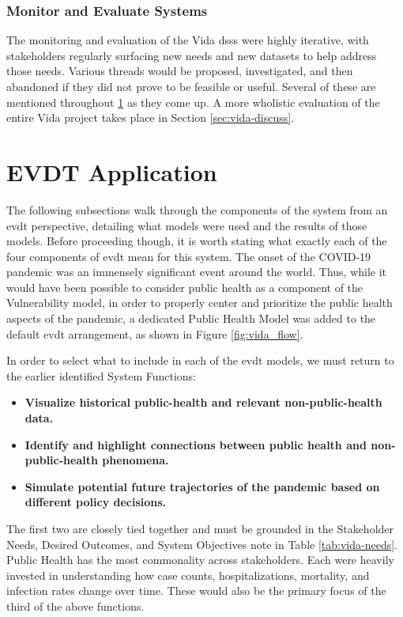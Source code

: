 \subsubsection{Monitor and Evaluate Systems}

The monitoring and evaluation of the Vida \acp{dss} were highly iterative, with stakeholders regularly surfacing new needs and new datasets to help address those needs. Various threads would be proposed, investigated, and then abandoned if they did not prove to be feasible or useful. Several of these are mentioned throughout \ref{sec:vida-evdt} as they come up. A more wholistic evaluation of the entire Vida project takes place in Section \ref{sec:vida-discuss}.

\section{EVDT Application} \label{sec:vida-evdt}

The following subsections walk through the components of the system from an \acf{evdt} perspective, detailing what models were used and the results of those models. Before proceeding though, it is worth stating what exactly each of the four components of \ac{evdt} mean for this system. The onset of the COVID-19 pandemic was an immensely significant event around the world. Thus, while it would have been possible to consider public health as a component of the Vulnerability model, in order to properly center and prioritize the public health aspects of the pandemic, a dedicated Public Health Model was added to the default \ac{evdt} arrangement, as shown in Figure \ref{fig:vida_flow}. 

In order to select what to include in each of the \ac{evdt} models, we must return to the earlier identified System Functions:

\begin{itemize}[itemsep=0pt,parsep=0pt]
	\item{\textbf{Visualize historical public-health and relevant non-public-health data.}}
	\item{\textbf{Identify and highlight connections between public health and non-public-health phenomena.}}
	\item{\textbf{Simulate potential future trajectories of the pandemic based on different policy decisions.}} 
\end{itemize}

The first two are closely tied together and must be grounded in the Stakeholder Needs, Desired Outcomes, and System Objectives note in Table \ref{tab:vida-needs}. Public Health has the most commonality across stakeholders. Each were heavily invested in understanding how case counts, hospitalizations, mortality, and infection rates change over time. These would also be the primary focus of the third of the above functions.


